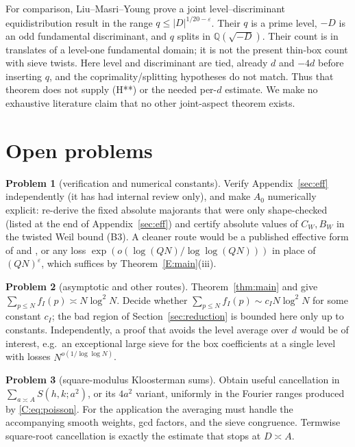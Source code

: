 \documentclass[10pt,reqno]{amsart}
\theoremstyle{definition}
\newtheorem{problem}{Problem}
\numberwithin{equation}{section}
\newcommand{\Q}{\mathbb Q}
\begin{document}
For comparison, Liu--Masri--Young
\cite[Theorem~1.4, and the more general Theorem~7.1]{LMY} prove a
joint level--discriminant equidistribution result in the range
$q\leq |D|^{1/20-\varepsilon}$.  Their $q$ is a prime level, $-D$ is
an odd fundamental discriminant, and $q$ splits in
$\Q(\sqrt{-D})$.  Their count is in translates of a level-one
fundamental domain; it is not the present thin-box count with sieve
twists.  Here level and discriminant are tied, already $d$ and $-4d$
before inserting $q$, and the coprimality/splitting hypotheses do not
match.  Thus that theorem does not supply (H**) or the needed per-$d$
estimate.  We make no exhaustive literature claim that no other
joint-aspect theorem exists.

\section{Open problems}\label{sec:open}
\begin{problem}[verification and numerical constants]
Verify Appendix~\ref{sec:eff} independently (it has had internal review
only), and make $A_0$ numerically explicit: re-derive the fixed absolute
majorants that were only shape-checked (listed at the end of
Appendix~\ref{sec:eff}) and certify absolute values of $C_W,B_W$ in the
twisted Weil bound (B3). A cleaner route would be a published effective
form of \cite[Theorem~7]{DI} and \cite[Lemma~4.10]{Dr}, or any loss
$\exp(o(\log(QN)/\log\log(QN)))$ in place of $(QN)^\varepsilon$, which suffices
by Theorem~\ref{E:main}(iii).
\end{problem}

\begin{problem}[asymptotic and other routes]
Theorem~\ref{thm:main} and \cite[Theorem~1.1]{ET} give
$\sum_{p\le N}f_I(p)\asymp N\log^2N$. Decide whether
$\sum_{p\le N}f_I(p)\sim c_IN\log^2N$ for some constant $c_I$;
the bad region of Section~\ref{sec:reduction} is
bounded here only up to constants. Independently, a proof that avoids the
level average over $d$ would be of interest, e.g.\ an exceptional large
sieve for the box coefficients at a single level with losses
$N^{o(1/\log\log N)}$.
\end{problem}

\begin{problem}[square-modulus Kloosterman sums]
Obtain useful cancellation in $\sum_{a\asymp A}S(h,k;a^2)$, or its
$4a^2$ variant, uniformly in the Fourier ranges produced by
\eqref{C:eq:poisson}.  For the application the averaging must handle
the accompanying smooth weights, gcd factors, and the sieve
congruence.  Termwise square-root cancellation is exactly the
estimate that stops at $D\asymp A$.
\end{problem}
\end{document}
